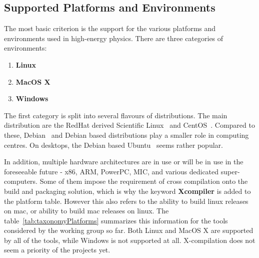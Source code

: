 \documentclass[12pt,a4paper]{article}
\begin{document}
\subsection{Supported Platforms and Environments}
The most basic criterion is the support for the various platforms and
environments used in high-energy physics. There are three categories of
environments:
\begin{enumerate}
\item \textbf{Linux}
\item \textbf{MacOS X}
\item \textbf{Windows}
\end{enumerate}
The first category is split into several flavours of distributions. The main
distribution are the RedHat derived Scientific Linux~\cite{sl} and
CentOS~\cite{centos}. Compared to these, Debian~\cite{debian} and Debian based
distributions play a smaller role in computing centres. On desktops, the Debian
based Ubuntu~\cite{ubuntu} seems rather popular.

In addition, multiple hardware architectures are in use or will be in use in the
foreseeable future - x86, ARM, PowerPC, MIC, and various dedicated
super-computers. Some of them impose the requirement of cross compilation onto
the build and packaging solution, which is why the keyword \textbf{Xcompiler}
is added to the platform table.  However this also refers to the ability to
build linux releases on mac, or ability to build mac releases on linux.
The table~\ref{tab:taxonomyPlatforms} summarizes this information for the tools
considered by the working group so far. Both Linux and MacOS X are supported by
all of the tools, while Windows is not supported at all. X-compilation does not
seem a priority of the projects yet.
\end{document}
